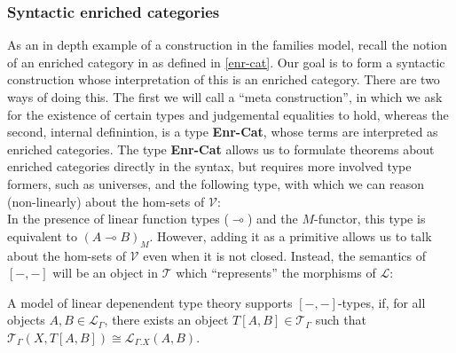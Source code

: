 \subsubsection{Syntactic enriched categories}
As an in depth example of a construction in the families model, recall the notion of an enriched category in as defined in \ref{enr-cat}.
Our goal is to form a syntactic construction whose interpretation of this is an enriched category. There are two ways of doing this. The first we will call a ``meta construction'', in which we ask for the existence of certain types and judgemental equalities to hold, whereas the second, internal definintion, is a type \textbf{Enr-Cat}, whose terms are interpreted as enriched categories. The type \textbf{Enr-Cat} allows us to formulate theorems about enriched categories directly in the syntax, but requires more involved type formers, such as universes, and the following type,
with which we can reason (non-linearly) about the hom-sets of $\mathcal{V}$:\\
In the presence of linear function types ($\multimap$) and the $M$-functor, this type is equivalent to $(A \multimap B)_M$. However, adding it as a primitive allows us to talk about the hom-sets of $\mathcal{V}$ even when it is not closed. Instead, the semantics of $[-, -]$ will be an object in $\mathcal{T}$ which ``represents'' the morphisms of $\mathcal{L}$:
\begin{defn}
  A model of linear depenendent type theory supports $[-,-]$-types, if, for all objects $A, B \in \mathcal{L}_{\Gamma}$, there exists an object $T[A, B] \in \mathcal{T}_{\Gamma}$ such that $\mathcal{T}_{\Gamma}(X, T[A, B]) \cong \mathcal{L}_{\Gamma.X}(A, B)$.
\end{defn}

